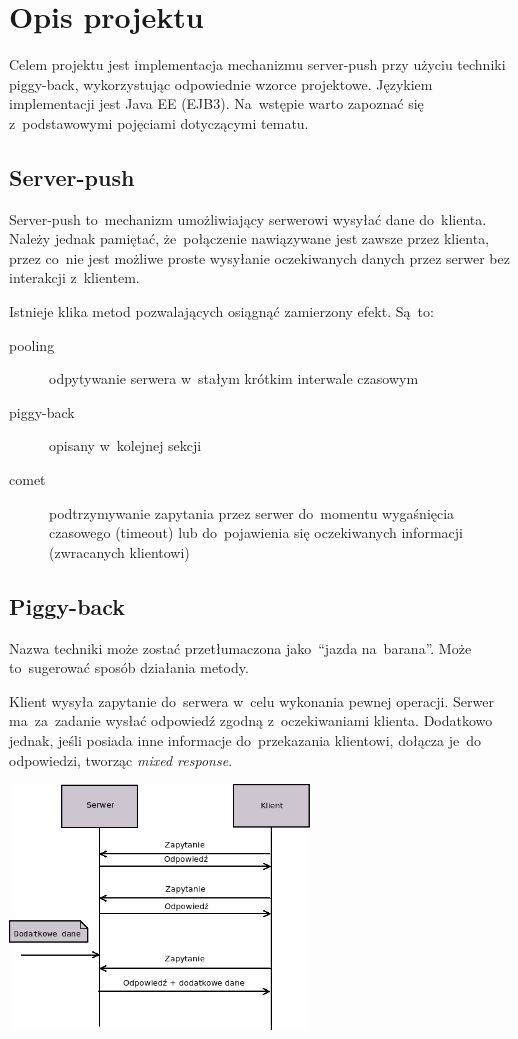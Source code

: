 \documentclass[11pt]{aghdpl}
\author{Wojciech Kasperek, Agnieszka Maksylewicz,}
\date{2014/2015}
\begin{document}
\titlepages
\vspace*{-20mm}
\tableofcontents
\clearpage

\chapter{Opis projektu}
Celem projektu jest implementacja mechanizmu server-push przy użyciu techniki piggy-back, wykorzystując odpowiednie wzorce projektowe. Językiem implementacji jest Java EE (EJB3). Na~wstępie warto zapoznać się z~podstawowymi pojęciami dotyczącymi tematu.


\section{Server-push}
Server-push to~mechanizm umożliwiający serwerowi wysyłać dane do~klienta. Należy jednak pamiętać, że~połączenie nawiązywane jest zawsze przez klienta, przez co~nie jest możliwe proste wysyłanie oczekiwanych danych przez serwer bez interakcji z~klientem.

Istnieje klika metod pozwalających osiągnąć zamierzony efekt. Są~to:
\begin{description}
 \item[pooling] odpytywanie serwera w~stałym krótkim interwale czasowym
 \item[piggy-back] opisany w~kolejnej sekcji
 \item[comet] podtrzymywanie zapytania przez serwer do~momentu wygaśnięcia czasowego (timeout) lub do~pojawienia się oczekiwanych informacji (zwracanych klientowi)
\end{description}


\section{Piggy-back}
Nazwa techniki może zostać przetłumaczona jako~``jazda na~barana''. Może to~sugerować sposób działania metody. 

Klient wysyła zapytanie do~serwera w~celu wykonania pewnej operacji. Serwer ma~za~zadanie wysłać odpowiedź zgodną z~oczekiwaniami klienta. Dodatkowo jednak, jeśli posiada inne informacje do~przekazania klientowi, dołącza je~do odpowiedzi, tworząc \textit{mixed response}.
\begin{center}
 \includegraphics[width=8cm]{piggy}
\end{center}
\end{document}
